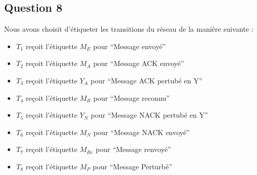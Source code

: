 \subsection{Question 8}
Nous avons choisit d'étiqueter les transitions du réseau de la manière suivante :
\begin{itemize}
\item $T_1$ reçoit l'étiquette $M_E$ pour ``Message envoyé''
\item $T_2$ reçoit l'étiquette $M_A$ pour ``Message ACK envoyé''
\item $T_3$ reçoit l'étiquette $Y_A$ pour ``Message ACK pertubé en Y''
\item $T_4$ reçoit l'étiquette $M_R$ pour ``Message reconnu''
\item $T_5$ reçoit l'étiquette $Y_N$ pour ``Message NACK pertubé en Y''
\item $T_6$ reçoit l'étiquette $M_N$ pour ``Message NACK envoyé''
\item $T_7$ reçoit l'étiquette $M_{Re}$ pour ``Message renvoyé''
\item $T_8$ reçoit l'étiquette $M_P$ pour ``Message Perturbé''
\end{itemize}

